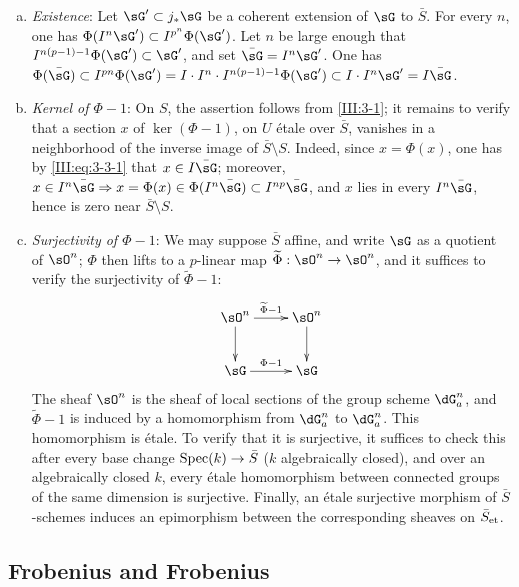 \begin{enumerate}[a)]
  \item \emph{Existence}: Let $\sG'\subset j_*\sG$ be a coherent extension
    of $\sG$ to $\bar S$. For every $n$, one has
    $\Phi(I^n \sG')\subset I^{p^n}\Phi(\sG')$. Let $n$ be large enough that
    $I^{n(p-1)-1}\Phi(\sG')\subset \sG'$, and set $\bar\sG=I^n\sG'$.
    One has $\Phi(\bar\sG)\subset I^{p n}\Phi(\sG')
    =I\cdot I^n\cdot I^{n(p-1)-1}\Phi(\sG')\subset I\cdot I^n\sG'
    = I\bar\sG$.
  \item \emph{Kernel of $\Phi-1$}: On $S$, the assertion follows from
    \ref{III:3-1}; it remains to verify that a section $x$ of
    $\ker(\Phi-1)$, on $U$ étale over $\bar S$, vanishes in a neighborhood of
    the inverse image of $\bar S\setminus S$. Indeed, since $x=\Phi(x)$, one
    has by \eqref{III:eq:3-3-1} that $x\in I\bar\sG$; moreover,
    $x\in I^n\bar\sG\Rightarrow x=\Phi(x)\in\Phi(I^n\bar\sG)\subset I^{n p}\bar\sG$, and $x$ lies in every $I^n\bar\sG$, hence is zero near
    $\bar S\setminus S$.
  \item \emph{Surjectivity of $\Phi-1$}: We may suppose $\bar S$ affine, and
    write $\sG$ as a quotient of $\sO^n$; $\Phi$ then lifts to a $p$-linear
    map $\widetilde\Phi:\sO^n\to\sO^n$, and it suffices to verify the
    surjectivity of $\widetilde\Phi-1$:
    \[\xymatrix{
      \sO^n \ar[r]^-{\widetilde \Phi-1} \ar[d]
        & \sO^n \ar[d] \\
      \sG \ar[r]^-{\Phi-1}
        & \sG
    }\]
    The sheaf $\sO^n$ is the sheaf of local sections of the group scheme
    $\dG_a^n$, and $\widetilde\Phi-1$ is induced by a homomorphism from
    $\dG_a^n$ to $\dG_a^n$. This homomorphism is étale. To verify that it is
    surjective, it suffices to check this after every base change
    $\operatorname{Spec}(k)\to\bar S$ ($k$ algebraically closed), and over an algebraically
    closed $k$, every étale homomorphism between connected groups of the same
    dimension is surjective. Finally, an étale surjective morphism of
    $\bar S$-schemes induces an epimorphism between the corresponding sheaves
    on ${\bar S}_{\textnormal{et}}$.
\end{enumerate}






\subsection{Frobenius and Frobenius}\label{III:3-4}

